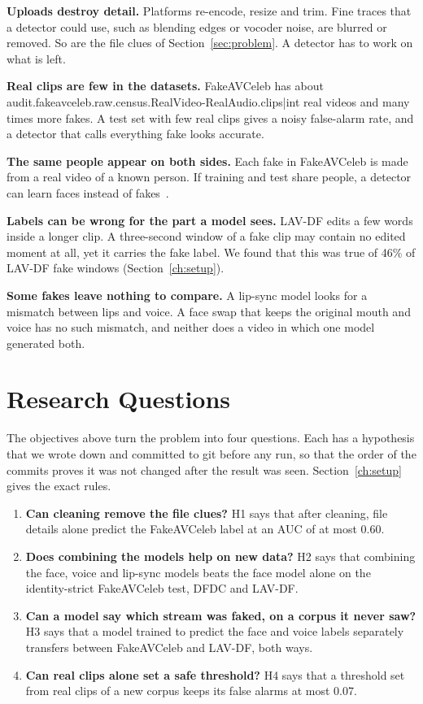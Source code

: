 \textbf{Uploads destroy detail.} Platforms re-encode, resize and trim. Fine
traces that a detector could use, such as blending edges or vocoder noise, are
blurred or removed. So are the file clues of Section~\ref{sec:problem}. A
detector has to work on what is left.

\textbf{Real clips are few in the datasets.} FakeAVCeleb has about
{{audit.fakeavceleb.raw.census.RealVideo-RealAudio.clips|int}} real videos and
many times more fakes. A test set with few real clips gives a noisy
false-alarm rate, and a detector that calls everything fake looks accurate.

\textbf{The same people appear on both sides.} Each fake in FakeAVCeleb is
made from a real video of a known person. If training and test share people,
a detector can learn faces instead of fakes~\cite{dong2023}.

\textbf{Labels can be wrong for the part a model sees.} LAV-DF edits a few
words inside a longer clip. A three-second window of a fake clip may contain
no edited moment at all, yet it carries the fake label. We found that this was
true of 46\% of LAV-DF fake windows (Section~\ref{ch:setup}).

\textbf{Some fakes leave nothing to compare.} A lip-sync model looks for a
mismatch between lips and voice. A face swap that keeps the original mouth and
voice has no such mismatch, and neither does a video in which one model
generated both.

\section{Research Questions}
\label{sec:questions}

The objectives above turn the problem into four questions. Each has a
hypothesis that we wrote down and committed to git before any run, so that
the order of the commits proves it was not changed after the result was seen.
Section~\ref{ch:setup} gives the exact rules.

\begin{enumerate}
    \item[\textbf{Q1.}] \textbf{Can cleaning remove the file clues?} H1 says
    that after cleaning, file details alone predict the FakeAVCeleb label at an
    AUC of at most 0.60.
    \item[\textbf{Q2.}] \textbf{Does combining the models help on new data?}
    H2 says that combining the face, voice and lip-sync models beats the face
    model alone on the identity-strict FakeAVCeleb test, DFDC and LAV-DF.
    \item[\textbf{Q3.}] \textbf{Can a model say which stream was faked, on a
    corpus it never saw?} H3 says that a model trained to predict the face and
    voice labels separately transfers between FakeAVCeleb and LAV-DF, both
    ways.
    \item[\textbf{Q4.}] \textbf{Can real clips alone set a safe threshold?} H4
    says that a threshold set from real clips of a new corpus keeps its false
    alarms at most 0.07.
\end{enumerate}

